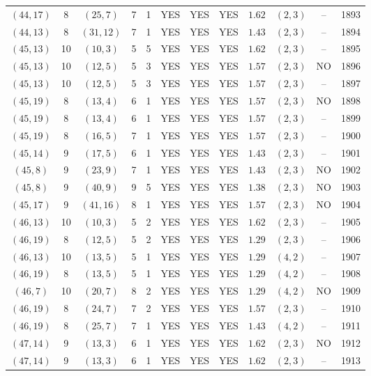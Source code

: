 \begin{longtable}{|c|c|c|c|c|c|c|c|c|c|c|c|}
$(44,17)$ & 8 & $(25,7)$ & 7 & 1 & YES & YES & YES & $1.62$ & $(2,3)$ & -- & 1893\\
$(44,13)$ & 8 & $(31,12)$ & 7 & 1 & YES & YES & YES & $1.43$ & $(2,3)$ & -- & 1894\\
$(45,13)$ & 10 & $(10,3)$ & 5 & 5 & YES & YES & YES & $1.62$ & $(2,3)$ & -- & 1895\\
$(45,13)$ & 10 & $(12,5)$ & 5 & 3 & YES & YES & YES & $1.57$ & $(2,3)$ & NO & 1896\\
$(45,13)$ & 10 & $(12,5)$ & 5 & 3 & YES & YES & YES & $1.57$ & $(2,3)$ & -- & 1897\\
$(45,19)$ & 8 & $(13,4)$ & 6 & 1 & YES & YES & YES & $1.57$ & $(2,3)$ & NO & 1898\\
$(45,19)$ & 8 & $(13,4)$ & 6 & 1 & YES & YES & YES & $1.57$ & $(2,3)$ & -- & 1899\\
$(45,19)$ & 8 & $(16,5)$ & 7 & 1 & YES & YES & YES & $1.57$ & $(2,3)$ & -- & 1900\\
$(45,14)$ & 9 & $(17,5)$ & 6 & 1 & YES & YES & YES & $1.43$ & $(2,3)$ & -- & 1901\\
$(45,8)$ & 9 & $(23,9)$ & 7 & 1 & YES & YES & YES & $1.43$ & $(2,3)$ & NO & 1902\\
$(45,8)$ & 9 & $(40,9)$ & 9 & 5 & YES & YES & YES & $1.38$ & $(2,3)$ & NO & 1903\\
$(45,17)$ & 9 & $(41,16)$ & 8 & 1 & YES & YES & YES & $1.57$ & $(2,3)$ & NO & 1904\\
$(46,13)$ & 10 & $(10,3)$ & 5 & 2 & YES & YES & YES & $1.62$ & $(2,3)$ & -- & 1905\\
$(46,19)$ & 8 & $(12,5)$ & 5 & 2 & YES & YES & YES & $1.29$ & $(2,3)$ & -- & 1906\\
$(46,13)$ & 10 & $(13,5)$ & 5 & 1 & YES & YES & YES & $1.29$ & $(4,2)$ & -- & 1907\\
$(46,19)$ & 8 & $(13,5)$ & 5 & 1 & YES & YES & YES & $1.29$ & $(4,2)$ & -- & 1908\\
$(46,7)$ & 10 & $(20,7)$ & 8 & 2 & YES & YES & YES & $1.29$ & $(4,2)$ & NO & 1909\\
$(46,19)$ & 8 & $(24,7)$ & 7 & 2 & YES & YES & YES & $1.57$ & $(2,3)$ & -- & 1910\\
$(46,19)$ & 8 & $(25,7)$ & 7 & 1 & YES & YES & YES & $1.43$ & $(4,2)$ & -- & 1911\\
$(47,14)$ & 9 & $(13,3)$ & 6 & 1 & YES & YES & YES & $1.62$ & $(2,3)$ & NO & 1912\\
$(47,14)$ & 9 & $(13,3)$ & 6 & 1 & YES & YES & YES & $1.62$ & $(2,3)$ & -- & 1913\\

\end{longtable}
